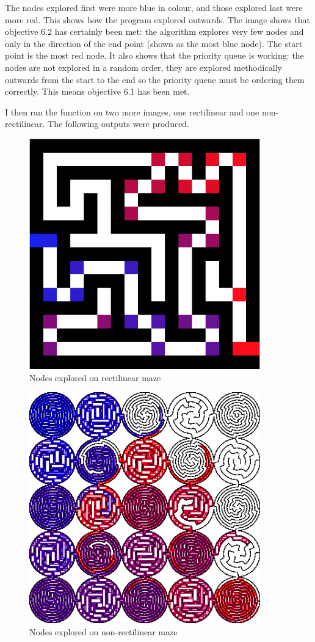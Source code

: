\documentclass[titlepage]{article}
\begin{document}
The nodes explored first were more blue in colour, and those explored last were more red. This shows how the program explored outwards. The image shows that objective 6.2 has certainly been met: the algorithm explores very few nodes and only in the direction of the end point (shown as the most blue node). The start point is the most red node. It also shows that the priority queue is working: the nodes are not explored in a random order, they are explored methodically outwards from the start to the end so the priority queue must be ordering them correctly. This means objective 6.1 has been met.

I then ran the function on two more images, one rectilinear and one non-rectilinear. The following outputs were produced.

\begin{figure}[H]
  \centering
  \includegraphics[width=10cm]{nodesmap.png}
  \caption{Nodes explored on rectilinear maze}
  \label{fig:dijk}
\end{figure}

\begin{figure}[H]
  \centering
  \includegraphics[width=10cm]{nodesmaprings.png}
  \caption{Nodes explored on non-rectilinear maze}
  \label{fig:dijk}
\end{figure}
\end{document}

